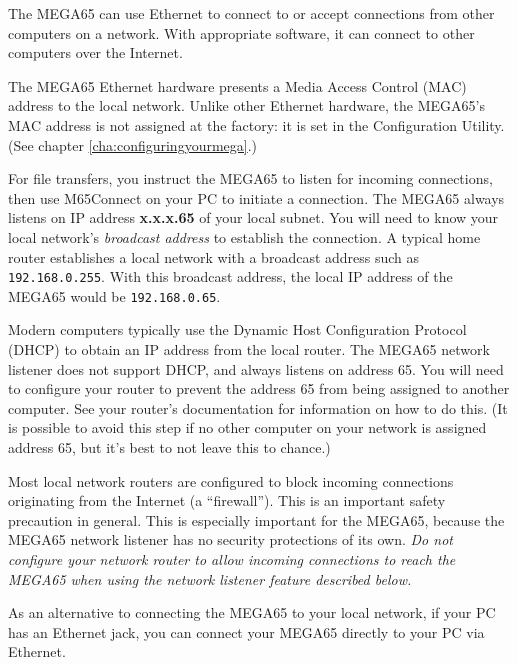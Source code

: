 The MEGA65 can use Ethernet to connect to or accept connections from other computers on a network. With appropriate software, it can connect to other computers over the Internet.

The MEGA65 Ethernet hardware presents a Media Access Control (MAC) address to the local network. Unlike other Ethernet hardware, the MEGA65's MAC address is not assigned at the factory: it is set in the Configuration Utility. (See chapter \vref{cha:configuringyourmega}.)


For file transfers, you instruct the MEGA65 to listen for incoming connections, then use M65Connect on your PC to initiate a connection. The MEGA65 always listens on IP address {\bf x.x.x.65} of your local subnet. You will need to know your local network's {\em broadcast address} to establish the connection. A typical home router establishes a local network with a broadcast address such as \texttt{192.168.0.255}. With this broadcast address, the local IP address of the MEGA65 would be \texttt{192.168.0.65}.

Modern computers typically use the Dynamic Host Configuration Protocol (DHCP) to obtain an IP address from the local router. The MEGA65 network listener does not support DHCP, and always listens on address 65. You will need to configure your router to prevent the address 65 from being assigned to another computer. See your router's documentation for information on how to do this. (It is possible to avoid this step if no other computer on your network is assigned address 65, but it's best to not leave this to chance.)

Most local network routers are configured to block incoming connections originating from the Internet (a ``firewall''). This is an important safety precaution in general. This is especially important for the MEGA65, because the MEGA65 network listener has no security protections of its own. {\em Do not configure your network router to allow incoming connections to reach the MEGA65 when using the network listener feature described below.}

As an alternative to connecting the MEGA65 to your local network, if your PC has an Ethernet jack, you can connect your MEGA65 directly to your PC via Ethernet.

